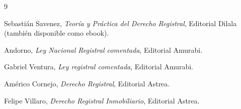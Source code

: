 \documentclass[12pt,oneside]{book}
\begin{document}

\begin{thebibliography}{9}

Sebastián Savenez,
\textit{Teoría y Práctica del Derecho Registral},
Editorial Dilala (también disponible como ebook).

Andorno,
\textit{Ley Nacional Registral comentada},
Editorial Amurabi.

Gabriel Ventura,
\textit{Ley registral comentada},
Editorial Amurabi.

Américo Cornejo,
\textit{Derecho Registral},
Editorial Astrea.

Felipe Villaro,
\textit{Derecho Registral Inmobiliario},
Editorial Astrea.

\end{thebibliography}
\end{document}

